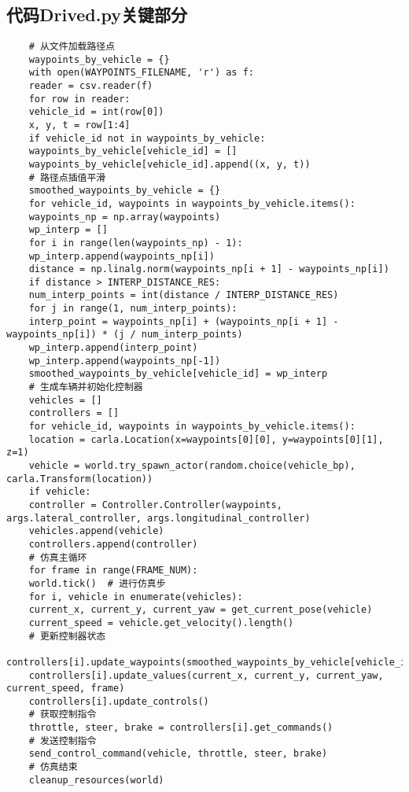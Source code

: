 \chapter{}

\section{代码Drived.py关键部分}
\begin{lstlisting}
	# 从文件加载路径点
	waypoints_by_vehicle = {}
	with open(WAYPOINTS_FILENAME, 'r') as f:
	reader = csv.reader(f)
	for row in reader:
	vehicle_id = int(row[0])
	x, y, t = row[1:4]
	if vehicle_id not in waypoints_by_vehicle:
	waypoints_by_vehicle[vehicle_id] = []
	waypoints_by_vehicle[vehicle_id].append((x, y, t))
	# 路径点插值平滑
	smoothed_waypoints_by_vehicle = {}
	for vehicle_id, waypoints in waypoints_by_vehicle.items():
	waypoints_np = np.array(waypoints)
	wp_interp = []
	for i in range(len(waypoints_np) - 1):
	wp_interp.append(waypoints_np[i])
	distance = np.linalg.norm(waypoints_np[i + 1] - waypoints_np[i])
	if distance > INTERP_DISTANCE_RES:
	num_interp_points = int(distance / INTERP_DISTANCE_RES)
	for j in range(1, num_interp_points):
	interp_point = waypoints_np[i] + (waypoints_np[i + 1] - waypoints_np[i]) * (j / num_interp_points)
	wp_interp.append(interp_point)
	wp_interp.append(waypoints_np[-1])
	smoothed_waypoints_by_vehicle[vehicle_id] = wp_interp
	# 生成车辆并初始化控制器
	vehicles = []
	controllers = []
	for vehicle_id, waypoints in waypoints_by_vehicle.items():
	location = carla.Location(x=waypoints[0][0], y=waypoints[0][1], z=1)
	vehicle = world.try_spawn_actor(random.choice(vehicle_bp), carla.Transform(location))
	if vehicle:
	controller = Controller.Controller(waypoints, args.lateral_controller, args.longitudinal_controller)
	vehicles.append(vehicle)
	controllers.append(controller)
	# 仿真主循环
	for frame in range(FRAME_NUM):
	world.tick()  # 进行仿真步
	for i, vehicle in enumerate(vehicles):
	current_x, current_y, current_yaw = get_current_pose(vehicle)
	current_speed = vehicle.get_velocity().length()
	# 更新控制器状态
	controllers[i].update_waypoints(smoothed_waypoints_by_vehicle[vehicle_ids[i]])
	controllers[i].update_values(current_x, current_y, current_yaw, current_speed, frame)
	controllers[i].update_controls()
	# 获取控制指令
	throttle, steer, brake = controllers[i].get_commands()
	# 发送控制指令
	send_control_command(vehicle, throttle, steer, brake)
	# 仿真结束
	cleanup_resources(world)
\end{lstlisting}

